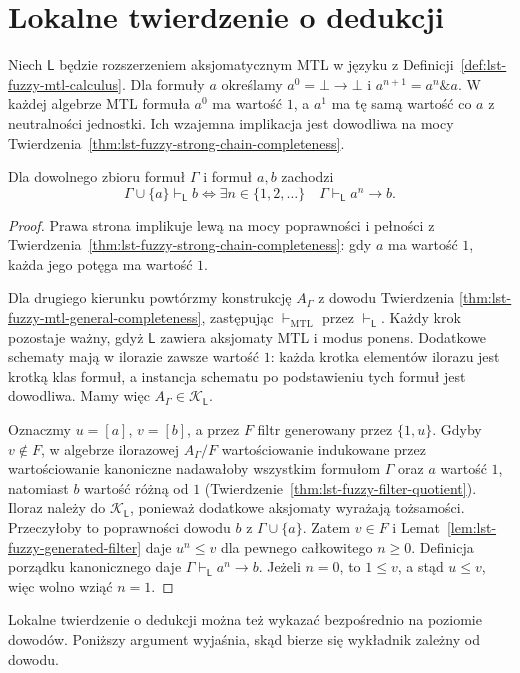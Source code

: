 \section{Lokalne twierdzenie o dedukcji}
Niech $\mathsf L$ będzie rozszerzeniem aksjomatycznym MTL
w języku z Definicji~\ref{def:lst-fuzzy-mtl-calculus}.
Dla formuły $a$ określamy $a^0=\bot\to\bot$ i
$a^{n+1}=a^n\mathbin{\&}a$. W każdej algebrze MTL formuła $a^0$ ma wartość $1$,
a $a^1$ ma tę samą wartość co $a$ z neutralności
jednostki. Ich wzajemna implikacja jest dowodliwa
na mocy Twierdzenia~\ref{thm:lst-fuzzy-strong-chain-completeness}.

\begin{twierdzenie}
\label{thm:lst-fuzzy-local-deduction}
Dla dowolnego zbioru formuł $\Gamma$ i formuł $a,b$ zachodzi
\[
 \Gamma\cup\{a\}\vdash_{\mathsf L} b
 \iff
 \exists n\in\{1,2,\ldots\}\quad
 \Gamma\vdash_{\mathsf L} a^n\to b.
\]
\end{twierdzenie}
\begin{proof}
Prawa strona implikuje lewą na mocy poprawności i pełności
z Twierdzenia~\ref{thm:lst-fuzzy-strong-chain-completeness}:
gdy $a$ ma wartość $1$, każda jego potęga ma wartość $1$.

Dla drugiego kierunku powtórzmy konstrukcję
$A_\Gamma$ z dowodu Twierdzenia
\ref{thm:lst-fuzzy-mtl-general-completeness}, zastępując
$\vdash_{\mathrm{MTL}}$ przez $\vdash_{\mathsf L}$.
Każdy krok pozostaje ważny, gdyż $\mathsf L$ zawiera
aksjomaty MTL i modus ponens. Dodatkowe schematy mają
w ilorazie zawsze wartość $1$: każda krotka elementów
ilorazu jest krotką klas formuł, a instancja schematu
po podstawieniu tych formuł jest dowodliwa.
Mamy więc $A_\Gamma\in\mathcal K_{\mathsf L}$.

Oznaczmy $u=[a]$, $v=[b]$, a przez $F$ filtr generowany
przez $\{1,u\}$. Gdyby $v\notin F$, w algebrze
ilorazowej $A_\Gamma/F$ wartościowanie indukowane
przez wartościowanie kanoniczne nadawałoby wszystkim
formułom $\Gamma$ oraz $a$ wartość $1$, natomiast
$b$ wartość różną od $1$
(Twierdzenie~\ref{thm:lst-fuzzy-filter-quotient}).
Iloraz należy do $\mathcal K_{\mathsf L}$, ponieważ
dodatkowe aksjomaty wyrażają tożsamości.
Przeczyłoby to poprawności dowodu $b$ z $\Gamma\cup\{a\}$.
Zatem $v\in F$ i Lemat~\ref{lem:lst-fuzzy-generated-filter}
daje $u^n\leq v$ dla pewnego całkowitego $n\geq0$.
Definicja porządku kanonicznego daje
$\Gamma\vdash_{\mathsf L}a^n\to b$.
Jeżeli $n=0$, to $1\leq v$, a stąd $u\leq v$,
więc wolno wziąć $n=1$.
\end{proof}
Lokalne twierdzenie o dedukcji można też wykazać bezpośrednio
na poziomie dowodów. Poniższy argument wyjaśnia, skąd bierze się
wykładnik zależny od dowodu.

